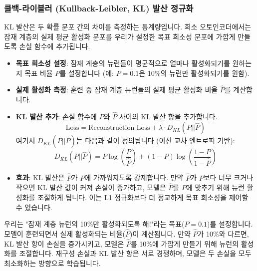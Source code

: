 \documentclass[11pt,a4paper]{article}
\theoremstyle{definition}
\begin{document}
\subsubsection{쿨백-라이블러 (Kullback-Leibler, KL) 발산 정규화}
KL 발산은 두 확률 분포 간의 차이를 측정하는 통계량입니다. 희소 오토인코더에서는 잠재 계층의 실제 평균 활성화 분포를 우리가 설정한 목표 희소성 분포에 가깝게 만들도록 손실 함수에 추가됩니다.

\begin{itemize}
    \item \textbf{목표 희소성 설정}: 잠재 계층의 뉴런들이 평균적으로 얼마나 활성화되기를 원하는지 목표 비율 $P$를 설정합니다 (예: $P=0.1$은 10\%의 뉴런만 활성화되기를 원함).
    \item \textbf{실제 활성화 측정}: 훈련 중 잠재 계층 뉴런들의 실제 평균 활성화 비율 $\hat{P}$를 계산합니다.
    \item \textbf{KL 발산 추가}: 손실 함수에 $P$와 $\hat{P}$ 사이의 KL 발산 항을 추가합니다.
        \begin{equation*}
        \text{Loss} = \text{Reconstruction Loss} + \lambda \cdot D_{KL}(P || \hat{P})
        \end{equation*}
        여기서 $D_{KL}(P || \hat{P})$는 다음과 같이 정의됩니다 (이진 교차 엔트로피 기반):
        \begin{equation*}
        D_{KL}(P || \hat{P}) = P \log\left(\frac{P}{\hat{P}}\right) + (1-P) \log\left(\frac{1-P}{1-\hat{P}}\right)
        \end{equation*}
    \item \textbf{효과}: KL 발산은 $\hat{P}$가 $P$에 가까워지도록 강제합니다. 만약 $\hat{P}$가 $P$보다 너무 크거나 작으면 KL 발산 값이 커져 손실이 증가하고, 모델은 $\hat{P}$를 $P$에 맞추기 위해 뉴런 활성화를 조절하게 됩니다. 이는 L1 정규화보다 더 정교하게 목표 희소성을 제어할 수 있습니다.
\end{itemize}

\begin{infobox}
우리는 "잠재 계층 뉴런의 10\%만 활성화되도록 해!"라는 목표($P=0.1$)를 설정합니다. 모델이 훈련되면서 실제 활성화되는 비율($\hat{P}$)이 계산됩니다. 만약 $\hat{P}$가 10\%와 다르면, KL 발산 항이 손실을 증가시키고, 모델은 $\hat{P}$를 10\%에 가깝게 만들기 위해 뉴런의 활성화를 조절합니다. 재구성 손실과 KL 발산 항은 서로 경쟁하며, 모델은 두 손실을 모두 최소화하는 방향으로 학습됩니다.
\end{infobox}
\end{document}
